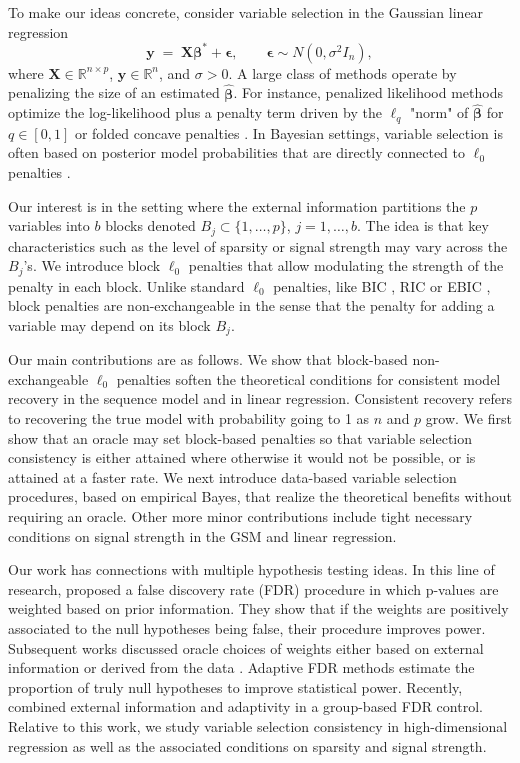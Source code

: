 \documentclass[aos]{imsart}
\theoremstyle{plain}
\newcommand{\R}{\mathbb{R}}
\newcommand{\bs}{\boldsymbol}
\begin{document}
To make our ideas concrete, consider variable selection in the Gaussian linear regression
\begin{equation}\label{eq:linearmodel}
	\bs y \;=\; \bs X \bs \beta^* + \bs\epsilon,\qquad \bs \epsilon \sim N(0,\sigma^2 I_n),
\end{equation}
where $\bs X\in \R^{n\times p}$, $\bs y\in \R^n$, and $\sigma >0$. A large class of methods operate by penalizing the size of an estimated $\hat{\bs  \beta}$. For instance, penalized likelihood methods optimize the log-likelihood plus a penalty term driven by the $\ell_q$ "norm" of $\hat{\bs  \beta}$ for $q\in [0,1]$ or folded concave penalties \citep{lasso,overviewvarsel,bertsimas}. 
In Bayesian settings, variable selection is often based on posterior model probabilities that are directly connected to $\ell_0$ penalties \citep{BIC,EBIC,rossell2022concentration}. 

Our interest is in the setting where the external information partitions the $p$ variables into $b$ blocks denoted $B_j \subset \{1,\ldots,p\}$, $j=1,\ldots,b$. The idea is that key characteristics such as the level of sparsity or signal strength may vary across the $B_j$'s. We introduce block $\ell_0$ penalties that allow modulating the strength of the penalty in each block. Unlike standard $\ell_0$ penalties, like BIC \cite{BIC}, RIC \cite{RIC} or EBIC \cite{EBIC}, block penalties are non-exchangeable in the sense that the penalty for adding a variable may depend on its block $B_j$.

Our main contributions are as follows. We show that block-based non-exchangeable $\ell_0$ penalties soften the theoretical conditions for consistent model recovery in the sequence model and in linear regression. Consistent recovery refers to recovering the true model with probability going to 1 as $n$ and $p$ grow. We first 
show that an oracle may set block-based penalties so that variable selection consistency is either attained where otherwise it would not be possible, or is attained at a faster rate. 
We next introduce data-based variable selection procedures, based on empirical Bayes, that realize the theoretical benefits without requiring an oracle. Other more minor contributions include tight necessary conditions on signal strength in the GSM and linear regression.

Our work has connections with multiple hypothesis testing ideas. In this line of research, \cite{genovese2006} proposed a false discovery rate (FDR) procedure in which p-values are weighted based on prior information. They show that if the weights are positively associated to the null hypotheses being false, their procedure improves power. Subsequent works discussed oracle choices of weights either based on external information or derived from the data \cite{roederwasserman,basu}. 
Adaptive FDR methods \cite{blanchard} estimate the
proportion of truly null hypotheses to improve statistical power.
Recently, \cite{ramdas2019prior} combined external information and adaptivity in a group-based FDR control. 
Relative to this work, we study variable selection consistency in high-dimensional regression as well as the associated conditions on sparsity and signal strength.
\end{document}
